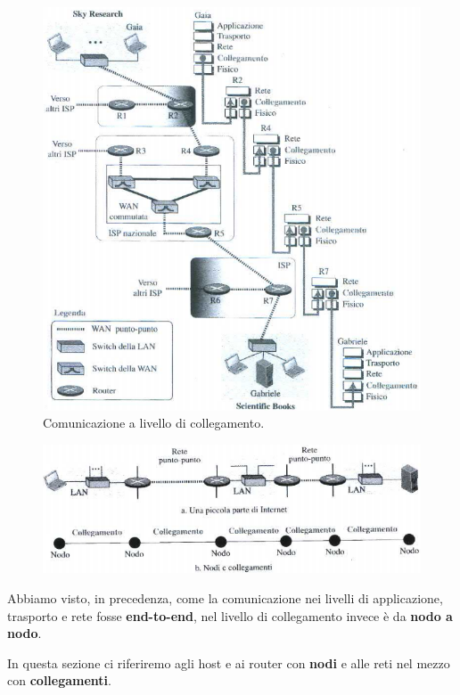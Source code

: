 \documentclass[11pt,a4paper,oneside]{book}
\theoremstyle{definition}
\begin{document}
\begin{figure}[!h]
	\includegraphics[scale=0.58]{Immagini/Link.png}
	\centering
	\caption{Comunicazione a livello di collegamento.}
\end{figure}

\pagebreak

\begin{figure}[!h]
	\includegraphics[scale=0.55]{Immagini/Link1.png}
	\centering
\end{figure}

Abbiamo visto, in precedenza, come la comunicazione nei livelli di applicazione, trasporto e rete fosse \textbf{end-to-end}, nel livello di collegamento invece è da \textbf{nodo a nodo}.

In questa sezione ci riferiremo agli host e ai router con \textbf{nodi} e alle reti nel mezzo con \textbf{collegamenti}.
\end{document}
